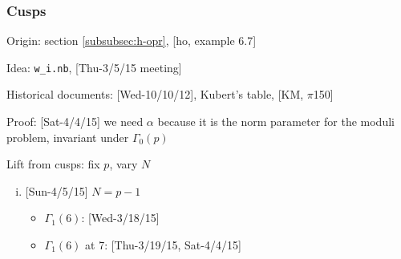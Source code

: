 \documentclass{rs}
\theoremstyle{definition}
\theoremstyle{remark}
\newcommand{\A}{\alpha}
\newcommand{\G}{\Gamma}
\renewcommand{\=}{\approx}
\renewcommand{\-}{\sim}
\numberwithin{equation}{section}
\numberwithin{thm}{section}
\begin{document}
\newpage
\subsubsection{Cusps}
\label{subsubsec:cusps}

Origin: section \ref{subsubsec:h-opr}, [ho, example 6.7] 

Idea: \texttt{w\_i.nb}, [Thu-3/5/15 meeting] 

Historical documents: [Wed-10/10/12], Kubert's table, [KM, $\pi$150] 

Proof: [Sat-4/4/15] 
we need $\A$ because it is the norm parameter for the moduli problem, invariant under $\G_0(p)$ 

Lift from cusps: fix $p$, vary $N$ 
\begin{enumerate}[(i)]
 \item {[Sun-4/5/15]} $N = p - 1$ 
 \begin{itemize}
  \item $\G_1(6)$: [Wed-3/18/15] 

  \item $\G_1(6)$ at 7: [Thu-3/19/15, Sat-4/4/15] 
 \end{itemize}


\end{enumerate}
\end{document}
